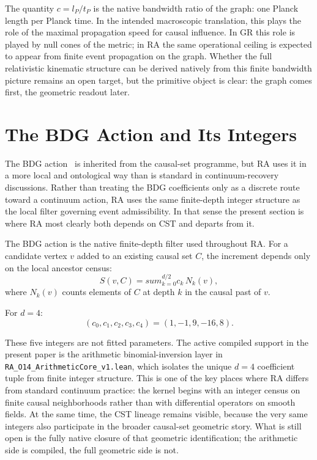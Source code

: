 \documentclass[11pt]{article}
\def\sum{sum}%
\begin{document}
The quantity $c=l_P/t_P$ is the native bandwidth ratio of the graph: one Planck length per Planck time. In the intended macroscopic translation, this plays the role of the maximal propagation speed for causal influence. In GR this role is played by null cones of the metric; in RA the same operational ceiling is expected to appear from finite event propagation on the graph. Whether the full relativistic kinematic structure can be derived natively from this finite bandwidth picture remains an open target, but the primitive object is clear: the graph comes first, the geometric readout later.

\section{The BDG Action and Its Integers}
\label{sec:bdg}

The BDG action~\cite{Benincasa2010} is inherited from the causal-set programme, but RA uses it in a more local and ontological way than is standard in continuum-recovery discussions. Rather than treating the BDG coefficients only as a discrete route toward a continuum action, RA uses the same finite-depth integer structure as the local filter governing event admissibility. In that sense the present section is where RA most clearly both depends on CST and departs from it.

The BDG action is the native finite-depth filter used throughout RA. For a candidate vertex $v$ added to an existing causal set $C$, the increment depends only on the local ancestor census:
\begin{equation}
S(v,C) = \sum_{k=0}^{d/2} c_k \, N_k(v),
\end{equation}
where $N_k(v)$ counts elements of $C$ at depth $k$ in the causal past of $v$.

For $d=4$:
\begin{equation}
\label{eq:bdg_d4}
(c_0,c_1,c_2,c_3,c_4)=(1,-1,9,-16,8).
\end{equation}

These five integers are not fitted parameters. The active compiled support in the present paper is the arithmetic binomial-inversion layer in \texttt{RA\_O14\_ArithmeticCore\_v1.lean}, which isolates the unique $d=4$ coefficient tuple from finite integer structure. This is one of the key places where RA differs from standard continuum practice: the kernel begins with an integer census on finite causal neighborhoods rather than with differential operators on smooth fields. At the same time, the CST lineage remains visible, because the very same integers also participate in the broader causal-set geometric story. What is still open is the fully native closure of that geometric identification; the arithmetic side is compiled, the full geometric side is not.
\end{document}
